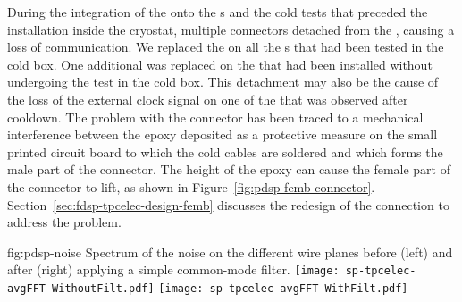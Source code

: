 \begin{comment}During the integration of the \dwords{femb} onto the \dword{apa}s 
and the cold tests that preceded the \dwords{apa} installation
inside the \dword{pdsp} cryostat a problem occurred %
on the 
connection between the cold readout and control cables and the
\dwords{femb}. In multiple cases the connector %
detached from
the \dword{femb} causing a loss of communication. 
\end{comment}
During the integration of the  onto the s 
and the cold tests that preceded the  installation
inside the  cryostat,  multiple connectors  
detached from
the , causing a loss of communication.  
We replaced the  %
on all the s that had been tested in the cold box. %
One additional  was 
replaced on the  that had been installed without undergoing 
the test in the cold box. This %
detachment may also be the cause
of the loss of the external clock signal on one of the 
that was observed after cooldown. %
%
The problem 
with the connector has been traced to a mechanical interference between 
the epoxy deposited as a protective measure on the small printed circuit
board to which the cold cables are soldered and which forms the 
male part of the connector. The height of the epoxy can cause 
the female part of the connector to lift, %
as shown in 
Figure~\ref{fig:pdsp-femb-connector}. %
Section~\ref{sec:fdsp-tpcelec-design-femb} discusses the redesign of the connection to address the problem.

\begin{dunefigure}
{fig:pdsp-noise}
{Spectrum of the noise on the different   wire planes before
(left) and after (right) applying a simple common-mode filter.}
\texttt{[image: sp-tpcelec-avgFFT-WithoutFilt.pdf]}
\texttt{[image: sp-tpcelec-avgFFT-WithFilt.pdf]}
\end{dunefigure}

